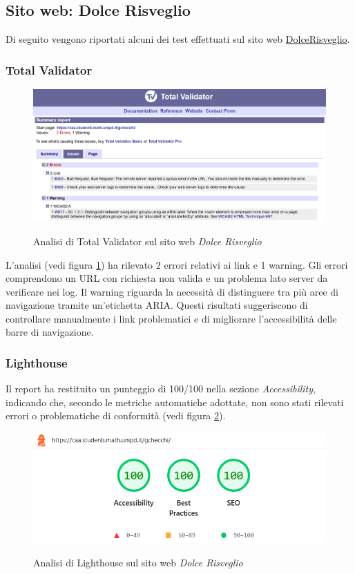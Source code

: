 \newpage
\subsection{Sito web: Dolce Risveglio}
\noindent Di seguito vengono riportati alcuni dei test effettuati sul sito web \href{https://caa.studenti.math.unipd.it/gchecchi/}{DolceRisveglio}.

\subsubsection{Total Validator}
\begin{figure}[H]
    \centering
    \includegraphics[width=0.9\linewidth, alt={Screenshot dell'analisi di Total Validator sul sito web Dolce Risveglio}]{img/TV_dolcerisveglio.png}
    \caption{Analisi di Total Validator sul sito web \textit{Dolce Risveglio}}\label{fig:TV_dolcerisveglio}
\end{figure}

\noindent L'analisi (vedi figura \ref{fig:TV_dolcerisveglio}) ha rilevato 2 errori relativi ai link e 1 warning. 
Gli errori comprendono un URL con richiesta non valida e un problema lato server da verificare nei log. 
Il warning riguarda la necessità di distinguere tra più aree di navigazione tramite un'etichetta ARIA. 
Questi risultati suggeriscono di controllare manualmente i link problematici e di migliorare l'accessibilità delle barre di navigazione.

\subsubsection{Lighthouse}
\noindent Il report ha restituito un punteggio di 100/100 nella sezione \textit{Accessibility}, indicando che, secondo le metriche automatiche adottate, non sono stati rilevati errori o problematiche di conformità (vedi figura \ref{fig:Lighthouse_dolcerisveglio}).
\begin{figure}[H]
    \centering
    \includegraphics[width=0.6\linewidth, alt={Screenshot dell'analisi di Lighthouse sul sito web DolceRisveglio}]{img/Lighthouse_dolcerisveglio.png}
    \caption{Analisi di Lighthouse sul sito web \textit{Dolce Risveglio}}\label{fig:Lighthouse_dolcerisveglio}
\end{figure}

